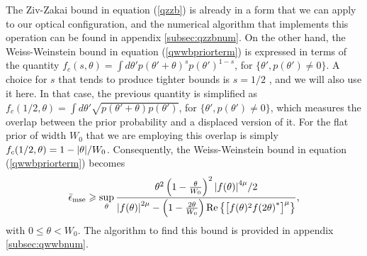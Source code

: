 The Ziv-Zakai bound in equation (\ref{qzzb}) is already in a form that we can apply to our optical configuration, and the numerical algorithm that implements this operation can be found in appendix \ref{subsec:qzzbnum}. On the other hand, the Weiss-Weinstein bound in equation (\ref{qwwbpriorterm}) is expressed in terms of the quantity $f_c(s,\theta) = \int d\theta' p(\theta' + \theta)^s p(\theta')^{1-s}$, for $\lbrace \theta', p(\theta')\neq 0\rbrace$. A choice for $s$ that tends to produce tighter bounds is $s=1/2$ \cite{tsang2016, weinstein1988}, and we will also use it here. In that case, the previous quantity is simplified as $f_c(1/2,\theta) = \int d\theta' \sqrt{p(\theta' + \theta) p(\theta')}$, for $\lbrace \theta', p(\theta')\neq 0\rbrace$, which measures the overlap between the prior probability and a displaced version of it. For the flat prior of width $W_0$ that we are employing this overlap is simply $f_c(1/2,\theta) = 1-\abs{\theta}/W_0$. Consequently, the Weiss-Weinstein bound in equation (\ref{qwwbpriorterm}) becomes
\begin{equation}
\bar{\epsilon}_{\mathrm{mse}} \geqslant \sup_{\theta} \frac{\theta^2 \left(1-\frac{\theta}{W_0}\right)^2 \abs{f(\theta)}^{4\mu}/2}{\abs{f(\theta)}^{2\mu} - \left(1-\frac{2\theta}{W_0}\right)\mathrm{Re}\left\lbrace \left[f(\theta)^{2} {f(2\theta)}^{*}\right ]^\mu \right\rbrace},
\label{qwwbsimpler}
\end{equation}
with $0 \leqslant \theta < W_0 $. The algorithm to find this bound is provided in appendix \ref{subsec:qwwbnum}. 

